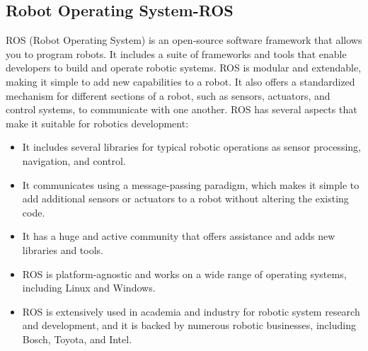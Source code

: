 \documentclass[11pt, a4paper, openany]{book}
\begin{document}
\subsection{Robot Operating System-ROS}
 ROS (Robot Operating System) is an open-source software framework that allows you to program robots. It includes a suite of frameworks and tools that enable developers to build and operate robotic systems. ROS is modular and extendable, making it simple to add new capabilities to a robot. It also offers a standardized mechanism for different sections of a robot, such as sensors, actuators, and control systems, to communicate with one another.
 \newline
 ROS has several aspects that make it suitable for robotics development:
 \begin{itemize}
 \item It includes several libraries for typical robotic operations as sensor processing, navigation, and control.
\item It communicates using a message-passing paradigm, which makes it simple to add additional sensors or actuators to a robot without altering the existing code.
\item It has a huge and active community that offers assistance and adds new libraries and tools.
\item ROS is platform-agnostic and works on a wide range of operating systems, including Linux and Windows.
\item ROS is extensively used in academia and industry for robotic system research and development, and it is backed by numerous robotic businesses, including Bosch, Toyota, and Intel.
 \end{itemize}
\end{document}
